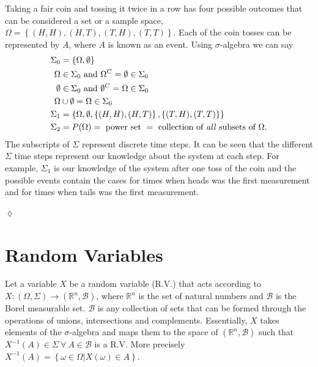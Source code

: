 \begin{example}
Taking a fair coin and tossing it twice in a row has four possible outcomes that can be considered a set or a sample space, $\Omega = \left\lbrace (H,H), (H,T), (T,H), (T,T) \right\rbrace$. Each of the coin tosses can be represented by $A$, where $A$ is known as an event. Using $\sigma$-algebra we can say
\begin{align*}
\Sigma_0 &= \left\lbrace \Omega, \emptyset \right\rbrace \\
\Omega &\in \Sigma_0 \textnormal{ and } \Omega^C = \emptyset \in \Sigma_0 \\
\emptyset &\in \Sigma_0 \textnormal{ and } \emptyset^C = \Omega \in \Sigma_0 \\
\Omega &\cup \emptyset = \Omega \in \Sigma_0 \\
\Sigma_1 &= \left\lbrace \Omega, \emptyset, \left\lbrace (H,H), (H,T) \right\rbrace, \left\lbrace (T,H), (T,T) \right\rbrace \right\rbrace \\
\Sigma_2 &= P(\Omega) = \textnormal{ power set } = \textnormal{ collection of \textit{all} subsets of } \Omega.
\end{align*}
The subscripts of $\Sigma$ represent discrete time steps. It can be seen that the different $\Sigma$ time steps represent our knowledge about the system at each step. For example, $\Sigma_1$ is our knowledge of the system after one toss of the coin and the possible events contain the cases for times when heads was the first measurement and for times when tails was the first measurement.
\end{example}
$\lozenge$

\section{Random Variables}
Let a variable $X$ be a random variable (R.V.) that acts according to \\
$X: (\Omega, \Sigma) \to (\mathbb{R}^n, \mathcal{B})$, where $\mathbb{R}^n$ is the set of natural numbers and $\mathcal{B}$ is the Borel measurable set. $\mathcal{B}$ is any collection of sets that can be formed through the operations of unions, intersections and complements. Essentially, $X$ takes elements of the $\sigma$-algebra and maps them to the space of $(\mathbb{R}^n, \mathcal{B})$ such that $X^{-1}(A) \in \Sigma ~ \forall ~ A \in \mathcal{B}$ is a R.V. More precisely $X^{-1}(A) = \left\lbrace \omega \in \Omega | X(\omega) \in A \right\rbrace$.

